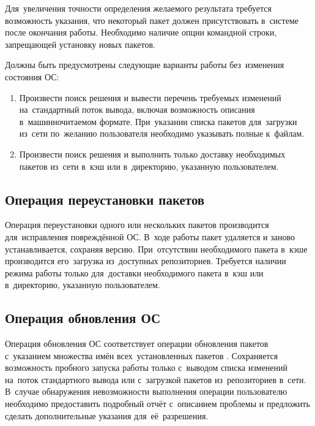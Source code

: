 Для~увеличения точности определения желаемого результата требуется возможность указания, 
что некоторый пакет должен присутствовать в~системе после окончания работы.
Необходимо наличие опции командной строки, запрещающей установку новых пакетов. 

Должны быть предусмотрены следующие варианты работы без~изменения состояния ОС:

\begin{enumerate}

\item {
Произвести поиск решения и вывести перечень требуемых изменений на~стандартный поток вывода,
включая возможность описания в~машинночитаемом формате.
При~указании списка пакетов для~загрузки из~сети по~желанию пользователя необходимо указывать полные  к~файлам.
}

\item {
Произвести поиск решения и выполнить только доставку необходимых пакетов из~сети в~кэш или в~директорию, указанную пользователем.
}

\end{enumerate}

\subsection{Операция переустановки пакетов}

Операция переустановки одного или нескольких пакетов производится для~исправления повреждённой ОС.
В~ходе работы пакет удаляется и заново устанавливается, сохраняя версию.
При~отсутствии необходимого пакета в~кэше производится  его~загрузка из~доступных репозиториев.
Требуется наличии режима работы только для~доставки необходимого пакета в~кэш или в~директорию, указанную пользователем.

\subsection{Операция обновления ОС}

Операция обновления ОС соответствует операции обновления пакетов с~указанием множества имён всех~установленных пакетов .
Сохраняется возможность пробного запуска работы только с~выводом списка изменений на~поток стандартного вывода или с~загрузкой пакетов из~репозиториев в~сети.
В~случае обнаружения невозможности выполнения операции пользователю необходимо предоставить подробный отчёт с~описанием проблемы и предложить сделать дополнительные указания для~её~разрешения.

